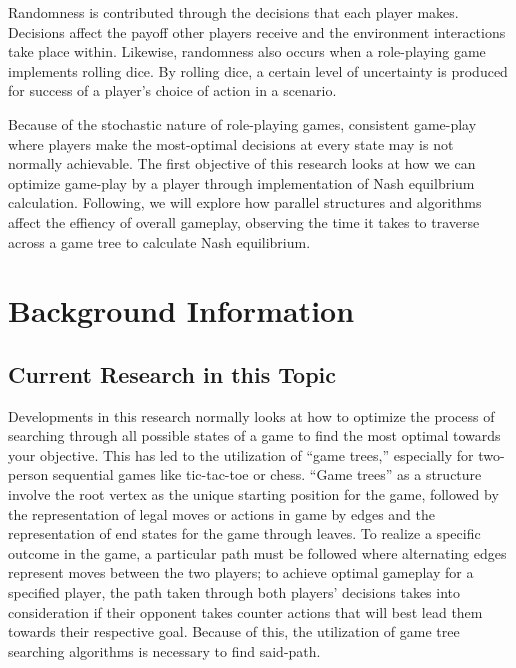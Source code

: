 \documentclass[conference]{IEEEtran}
\begin{document}
Randomness is contributed through the decisions that each player makes. Decisions affect the payoff other players receive and the environment interactions take place within. Likewise, randomness also occurs when a role-playing game implements rolling dice. By rolling dice, a certain level of uncertainty is produced for success of a player's choice of action in a scenario.

Because of the stochastic nature of role-playing games, consistent game-play where players make the most-optimal decisions at every state may is not normally achievable. The first objective of this research looks at how we can optimize game-play by a player through implementation of Nash equilbrium calculation. Following, we will explore how parallel structures and algorithms affect the effiency of overall gameplay, observing the time it takes to traverse across a game tree to calculate Nash equilibrium.

\section{Background Information}

\subsection{Current Research in this Topic}

Developments in this research normally looks at how to optimize the process of searching through all possible states of a game to find the most optimal towards your objective. This has led to the utilization of ``game trees,'' especially for two-person sequential games like tic-tac-toe or chess. ``Game trees'' as a structure involve the root vertex as the unique starting position for the game, followed by the representation of legal moves or actions in game by edges and the representation of end states for the game through leaves. To realize a specific outcome in the game,  a particular path must be followed where alternating edges represent moves between the two players; to achieve optimal gameplay for a specified player, the path taken through both players' decisions takes into consideration if their opponent takes counter actions that will best lead them towards their respective goal. Because of this, the utilization of game tree searching algorithms is necessary to find said-path.
\smallskip
\end{document}
